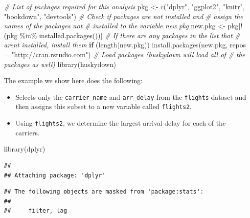 \documentclass[print]{nuthesis}
\newenvironment{Shaded}{\begin{snugshade}}{\end{snugshade}}
\newcommand{\AttributeTok}[1]{\textcolor[rgb]{0.77,0.63,0.00}{#1}}
\newcommand{\CommentTok}[1]{\textcolor[rgb]{0.56,0.35,0.01}{\textit{#1}}}
\newcommand{\ControlFlowTok}[1]{\textcolor[rgb]{0.13,0.29,0.53}{\textbf{#1}}}
\newcommand{\FunctionTok}[1]{\textcolor[rgb]{0.00,0.00,0.00}{#1}}
\newcommand{\NormalTok}[1]{#1}
\newcommand{\OtherTok}[1]{\textcolor[rgb]{0.56,0.35,0.01}{#1}}
\newcommand{\SpecialCharTok}[1]{\textcolor[rgb]{0.00,0.00,0.00}{#1}}
\newcommand{\StringTok}[1]{\textcolor[rgb]{0.31,0.60,0.02}{#1}}
\begin{document}
\begin{Shaded}
\begin{Highlighting}[]
\CommentTok{\# List of packages required for this analysis}
\NormalTok{pkg }\OtherTok{\textless{}{-}} \FunctionTok{c}\NormalTok{(}\StringTok{"dplyr"}\NormalTok{, }\StringTok{"ggplot2"}\NormalTok{, }\StringTok{"knitr"}\NormalTok{, }\StringTok{"bookdown"}\NormalTok{, }
    \StringTok{"devtools"}\NormalTok{)}
\CommentTok{\# Check if packages are not installed and}
\CommentTok{\# assign the names of the packages not}
\CommentTok{\# installed to the variable new.pkg}
\NormalTok{new.pkg }\OtherTok{\textless{}{-}}\NormalTok{ pkg[}\SpecialCharTok{!}\NormalTok{(pkg }\SpecialCharTok{\%in\%} \FunctionTok{installed.packages}\NormalTok{())]}
\CommentTok{\# If there are any packages in the list that}
\CommentTok{\# aren\textquotesingle{}t installed, install them}
\ControlFlowTok{if}\NormalTok{ (}\FunctionTok{length}\NormalTok{(new.pkg)) }\FunctionTok{install.packages}\NormalTok{(new.pkg, }
    \AttributeTok{repos =} \StringTok{"http://cran.rstudio.com"}\NormalTok{)}
\CommentTok{\# Load packages (huskydown will load all of}
\CommentTok{\# the packages as well)}
\FunctionTok{library}\NormalTok{(huskydown)}
\end{Highlighting}
\end{Shaded}

\clearpage

The example we show here does the following:

\begin{itemize}
\item
  Selects only the \texttt{carrier\_name} and \texttt{arr\_delay} from the \texttt{flights} dataset and then assigns this subset to a new variable called \texttt{flights2}.
\item
  Using \texttt{flights2}, we determine the largest arrival delay for each of the carriers.
\end{itemize}

\begin{Shaded}
\begin{Highlighting}[]
\FunctionTok{library}\NormalTok{(dplyr)}
\end{Highlighting}
\end{Shaded}

\begin{verbatim}
## 
## Attaching package: 'dplyr'
\end{verbatim}

\begin{verbatim}
## The following objects are masked from 'package:stats':
## 
##     filter, lag
\end{verbatim}
\end{document}
